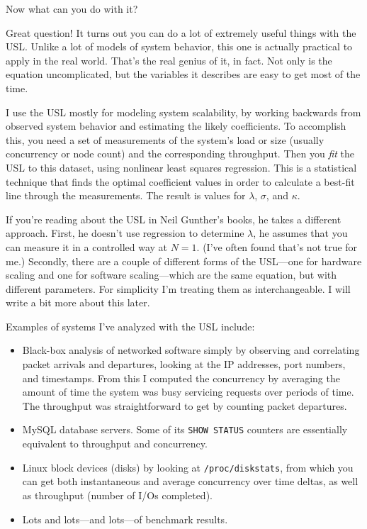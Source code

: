 \documentclass{vivid_layout}
\begin{document}
Now what can you do with it?

Great question! It turns out you can do a lot of extremely useful things with the
USL.  Unlike a lot of models of system behavior, this one is actually practical
to apply in the real world. That's the real genius of it, in fact. Not only is
the equation uncomplicated, but the variables it describes are easy to get most
of the time.

I use the USL mostly for modeling system scalability, by working backwards from
observed system behavior and estimating the likely coefficients. To accomplish
this, you need a set of measurements of the system's load or size (usually
concurrency or node count) and the corresponding throughput. Then you {\itshape
fit} the USL to this dataset, using nonlinear least squares regression. This is
a statistical technique that finds the optimal coefficient values in order to
calculate a best-fit line through the measurements. The result is values for
$\lambda$, $\sigma$, and $\kappa$.

If you're reading about the USL in Neil Gunther's books, he takes a different
approach. First, he doesn't use regression to determine $\lambda$, he assumes
that you can measure it in a controlled way at $N=1$. (I've often found that's
not true for me.) Secondly, there are a couple of different forms of the
USL---one for hardware scaling and one for software scaling---which are the same
equation, but with different parameters. For simplicity I'm treating them as
interchangeable. I will write a bit more about this later.

Examples of systems I've analyzed with the USL include:

\begin{itemize}
\item Black-box analysis of networked software simply by observing and
correlating packet arrivals and departures, looking at the IP addresses, port
numbers, and timestamps. From this I computed the concurrency by averaging the
amount of time the system was busy servicing requests over periods of time. The
throughput was straightforward to get by counting packet departures.
\item MySQL database servers. Some of its \texttt{SHOW STATUS} counters are
essentially equivalent to throughput and concurrency.
\item Linux block devices (disks) by looking at \texttt{/proc/diskstats}, from
which you can get both instantaneous and average concurrency over time deltas,
as well as throughput (number of I/Os completed).
\item Lots and lots---and lots---of benchmark results.
\end{itemize}
\end{document}
